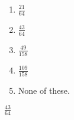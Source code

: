 \ifactodd
	\begin{enumerate}[label=\textbf{\Alph*.},itemsep=\fill,align=left]
		\item $\frac{21}{64} $ 
		\item $\frac{43}{64} $ %
		\item $\frac{49}{158} $ 
		\item $\frac{109}{158} $
		\item None of these. 
	\end{enumerate}
\else
\fi

\ifgridin
 $\frac{43}{64} $ %
		
\else
\fi

